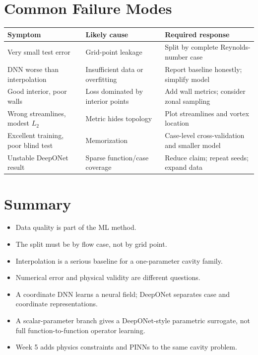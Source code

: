 \documentclass[11pt]{article}
\begin{document}
\section{Common Failure Modes}
\begin{longtable}{p{}p{}p{}}
\toprule
Symptom & Likely cause & Required response\\
\midrule
Very small test error & Grid-point leakage & Split by complete Reynolds-number case\\
DNN worse than interpolation & Insufficient data or overfitting & Report baseline honestly; simplify model\\
Good interior, poor walls & Loss dominated by interior points & Add wall metrics; consider zonal sampling\\
Wrong streamlines, modest $L_2$ & Metric hides topology & Plot streamlines and vortex location\\
Excellent training, poor blind test & Memorization & Case-level cross-validation and smaller model\\
Unstable DeepONet result & Sparse function/case coverage & Reduce claim; repeat seeds; expand data\\
\bottomrule
\end{longtable}

\section{Summary}
\begin{itemize}
\item Data quality is part of the ML method.
\item The split must be by flow case, not by grid point.
\item Interpolation is a serious baseline for a one-parameter cavity family.
\item Numerical error and physical validity are different questions.
\item A coordinate DNN learns a neural field; DeepONet separates case and coordinate representations.
\item A scalar-parameter branch gives a DeepONet-style parametric surrogate, not full function-to-function operator learning.
\item Week 5 adds physics constraints and PINNs to the same cavity problem.
\end{itemize}
\end{document}
